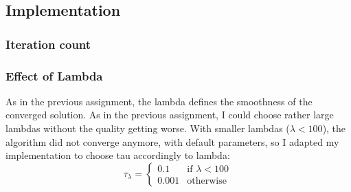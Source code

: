 \documentclass{paper}
\begin{document}
\subsection*{Implementation}

\subsubsection*{Iteration count}


\subsubsection*{Effect of Lambda}
As in the previous assignment, the lambda defines the smoothness of the converged
solution. As in the previous assignment, I could choose rather large lambdas
without the quality getting worse. 
With smaller lambdas ($ \lambda < 100 $), the algorithm did not converge anymore,
with default parameters, so I adapted my implementation to choose tau accordingly
to lambda:
\begin{equation}
	\tau_\lambda = 
	\begin{cases} 
		0.1 &\mbox{if } \lambda < 100 \\ 
		0.001 & \mbox{otherwise } 
	\end{cases}
\end{equation}
\end{document}
